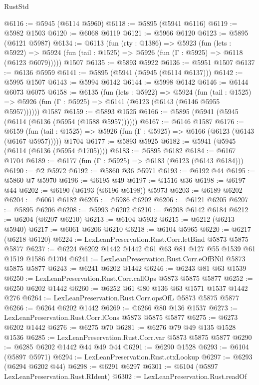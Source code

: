 \begin{lexlean}{RustStd}
\begin{coremodule}
{{@6116 := @5945 (@6114 @5960)
@6118 := @5895 (@5941 @6116)
@6119 := @5982 @1503
@6120 := @6068 @6119
@6121 := @5966 @6120
@6123 := @5895 (@6121 @5987)
@6134 := @6113
    (fun (rty : @1386) =>
    @5923
      (fun (lets : @5922) =>
      @5924 (fun (tail : @1525) => @5926 (fun (Γ : @5925) => @6118 (@6123 @6079)))))
    @1507
@6135 := @5893 @5922
@6136 := @5951 @1507
@6137 := @6136 @5959
@6141 := @5895 (@5941 (@5945 (@6114 @6137)))
@6142 := @5995 @1507
@6143 := @5994 @6142
@6144 := @5998 @6142
@6146 := @6144 @6073 @6075
@6158 := @6135
    (fun (lets : @5922) =>
    @5924
      (fun (tail : @1525) => @5926 (fun (Γ : @5925) => @6141 (@6123 (@6143 (@6146 @5955 @5957))))))
    @1587
@6159 := @5893 @1525
@6166 := @5895 (@5941 (@5945 (@6114 (@6136 (@5954 (@1588 @5957))))))
@6167 := @6146 @1587
@6176 := @6159
    (fun (tail : @1525) => @5926 (fun (Γ : @5925) => @6166 (@6123 (@6143 (@6167 @5957)))))
    @1704
@6177 := @5893 @5925
@6182 := @5941 (@5945 (@6114 (@6136 (@5954 @1705))))
@6183 := @5895 @6182
@6184 := @6167 @1704
@6189 := @6177 (fun (Γ : @5925) => @6183 (@6123 (@6143 @6184)))
@6190 := @2 @5972
@6192 := @5860 @36 @5971
@6193 := @6192 @44
@6195 := @5860 @7 @5970
@6196 := @6195 @49
@6197 := @1516 @36
@6198 := @6197 @44
@6202 := @6190 (@6193 (@6196 @6198)) @5973
@6203 := @6189 @6202
@6204 := @6061 @6182
@6205 := @5986 @6202
@6206 := @6121 @6205
@6207 := @5895 @6206
@6208 := @5993 @6202
@6210 := @6208 @6142 @6184
@6212 := @6204 (@6207 @6210)
@6213 := @6104 @5932
@6215 := @6212 (@6213 @5940)
@6217 := @6061 @6206 @6210
@6218 := @6104 @5965
@6220 := @6217 (@6218 @6120)
@6224 := LexLeanPreservation.Rust.Corr.letBind @5873 @5875 @5877
@6237 := @6224 @6202 @1442 @1442 @61 @63 @81 @127 @55 @1539 @61 @1519 @1586 @1704
@6241 := LexLeanPreservation.Rust.Corr.eOfBNil @5873 @5875 @5877
@6243 := @6241 @6202 @1442
@6246 := @6243 @81 @63 @1539
@6250 := LexLeanPreservation.Rust.Corr.callOps @5873 @5875 @5877
@6252 := @6250 @6202 @1442
@6260 := @6252 @61 @80 @136 @63 @1571 @1537 @1442 @276
@6264 := LexLeanPreservation.Rust.Corr.opsOfL @5873 @5875 @5877
@6266 := @6264 @6202 @1442
@6269 := @6266 @80 @136 @1537
@6273 := LexLeanPreservation.Rust.Corr.lCons @5873 @5875 @5877
@6275 := @6273 @6202 @1442
@6276 := @6275 @70
@6281 := @6276 @79 @49 @135 @1528 @1536
@6285 := LexLeanPreservation.Rust.Corr.var @5873 @5875 @5877
@6290 := @6285 @6202 @1442 @44 @49 @44
@6291 := @6290 @1528
@6293 := @6104 (@5897 @5971)
@6294 := LexLeanPreservation.Rust.ctxLookup
@6297 := @6293 (@6294 @6202 @44)
@6298 := @6291 @6297
@6301 := @6104 (@5897 LexLeanPreservation.Rust.RIdent)
@6302 := LexLeanPreservation.Rust.readOf
}}
\end{coremodule}
\end{lexlean}
